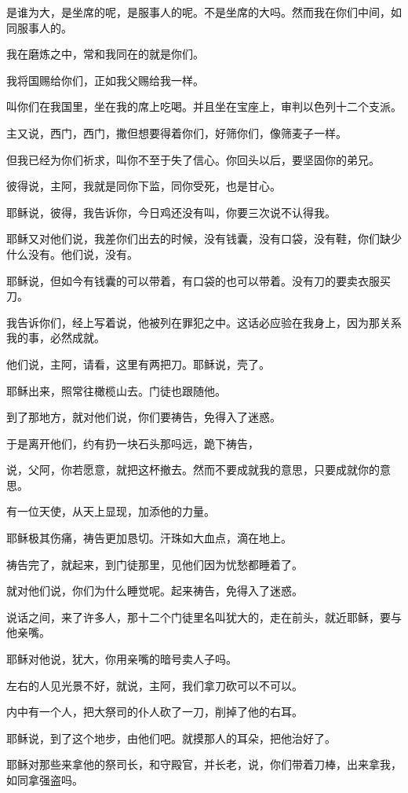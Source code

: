\documentclass[12pt,oneside]{book}
\begin{document}
是谁为大，是坐席的呢，是服事人的呢。不是坐席的大吗。然而我在你们中间，如同服事人的。

我在磨炼之中，常和我同在的就是你们。

我将国赐给你们，正如我父赐给我一样。

叫你们在我国里，坐在我的席上吃喝。并且坐在宝座上，审判以色列十二个支派。

主又说，西门，西门，撒但想要得着你们，好筛你们，像筛麦子一样。

但我已经为你们祈求，叫你不至于失了信心。你回头以后，要坚固你的弟兄。

彼得说，主阿，我就是同你下监，同你受死，也是甘心。

耶稣说，彼得，我告诉你，今日鸡还没有叫，你要三次说不认得我。

耶稣又对他们说，我差你们出去的时候，没有钱囊，没有口袋，没有鞋，你们缺少什么没有。他们说，没有。

耶稣说，但如今有钱囊的可以带着，有口袋的也可以带着。没有刀的要卖衣服买刀。

我告诉你们，经上写着说，他被列在罪犯之中。这话必应验在我身上，因为那关系我的事，必然成就。

他们说，主阿，请看，这里有两把刀。耶稣说，壳了。

耶稣出来，照常往橄榄山去。门徒也跟随他。

到了那地方，就对他们说，你们要祷告，免得入了迷惑。

于是离开他们，约有扔一块石头那吗远，跪下祷告，

说，父阿，你若愿意，就把这杯撤去。然而不要成就我的意思，只要成就你的意思。

有一位天使，从天上显现，加添他的力量。

耶稣极其伤痛，祷告更加恳切。汗珠如大血点，滴在地上。

祷告完了，就起来，到门徒那里，见他们因为忧愁都睡着了。

就对他们说，你们为什么睡觉呢。起来祷告，免得入了迷惑。

说话之间，来了许多人，那十二个门徒里名叫犹大的，走在前头，就近耶稣，要与他亲嘴。

耶稣对他说，犹大，你用亲嘴的暗号卖人子吗。

左右的人见光景不好，就说，主阿，我们拿刀砍可以不可以。

内中有一个人，把大祭司的仆人砍了一刀，削掉了他的右耳。

耶稣说，到了这个地步，由他们吧。就摸那人的耳朵，把他治好了。

耶稣对那些来拿他的祭司长，和守殿官，并长老，说，你们带着刀棒，出来拿我，如同拿强盗吗。
\end{document}

